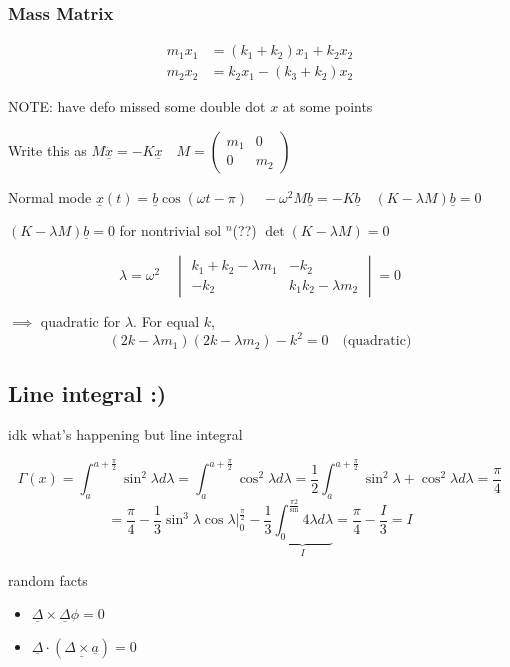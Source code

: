 \documentclass{article}
\begin{document}
\subsubsection{Mass Matrix}
\begin{align*}
    m_{1}x_{1} &= (k_{1} + k_{2}) x_{1} + k_{2}x_{2}\\
    m_{2}x_{2} &= k_{2}x_{1} - (k_{3} + k_{2})x_{2}
\end{align*}

NOTE: have defo missed some double dot $x$ at some points

Write this as $M\underline{\ddot{x}} = -K\underline{x} \quad M = \begin{pmatrix}
    m_{1} & 0 \\
    0 & m_{2}
\end{pmatrix}$

Normal mode $\underline{x}(t) = \underline{b}\cos(\omega t - \pi) \quad -\omega^{2} M \underline{b} = -K \underline{b} \quad (K - \lambda M)\underline{ b} = 0$

$(K - \lambda M) \underline{b} = 0$ for nontrivial sol $^{n}$(??) $\det(K - \lambda M) = 0$

\[ \lambda = \omega^{2} \quad \begin{vmatrix}
    k_{1} + k_{2} - \lambda m_{1} & -k_{2} \\
    -k_{2} & k_{1} k_{2} - \lambda m_{2}
\end{vmatrix} = 0\]

$\implies$ quadratic for $\lambda$. For equal $k$,
\[(2k - \lambda m_{1})(2k - \lambda m_{2}) - k^{2} = 0 \quad \text{(quadratic)}\]

\newpage

\subsection{Line integral :)}

idk what's happening but line integral

\[\Gamma(x) = \int_{a}^{a + \frac{\pi}{2}} \sin^{2}\lambda d\lambda = \int_{a}^{a + \frac{\pi}{2}} \cos^{2}\lambda d\lambda = \frac{1}{2} \int_{a}^{a + \frac{\pi}{2}} \sin^{2}\lambda + \cos^{2}\lambda d\lambda = \frac{\pi}{4}\]
\[ = \frac{\pi}{4} - \frac{1}{3} \sin^{3}\lambda\cos\lambda \bigg\rvert^{\frac{\pi}{2}}_{0} - \frac{1}{3} \underbrace{\int_{0}^\frac{{\pi}{2}} \sin{4}\lambda d\lambda}_{I} = \frac{\pi}{4} - \frac{I}{3} = I\]

random facts
\begin{itemize}
    \item $\underline{\Delta} \times \underline{\Delta} \phi = 0$
    \item $\underline{\Delta} \cdot (\underline{ \Delta \times \underline{a}}) = 0$
\end{itemize}
\end{document}
